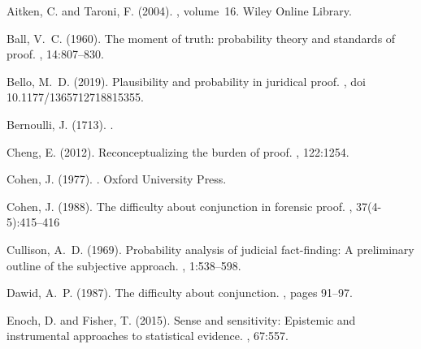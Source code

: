 \documentclass{ifcolog}
\begin{document}


\begin{thebibliography}{}

Aitken, C. and Taroni, F. (2004).
, volume~16.
\newblock Wiley Online Library.

Ball, V.~C. (1960).
\newblock The moment of truth: probability theory and standards of proof.
, 14:807--830.

Bello, M.~D. (2019).
\newblock Plausibility and probability in juridical proof.
, doi 10.1177/1365712718815355.

Bernoulli, J. (1713).
.

Cheng, E. (2012).
\newblock Reconceptualizing the burden of proof.
, 122:1254.

Cohen, J. (1977).
.
\newblock Oxford University Press.


Cohen, J. (1988).
\newblock The difficulty about conjunction in forensic proof.
, 37(4-5):415--416
  
 


Cullison, A.~D. (1969).
\newblock Probability analysis of judicial fact-finding: A preliminary outline
  of the subjective approach.
, 1:538--598.

Dawid, A.~P. (1987).
\newblock The difficulty about conjunction.
, pages 91--97.

Enoch, D. and Fisher, T. (2015).
\newblock Sense and sensitivity: Epistemic and instrumental approaches to
  statistical evidence.
, 67:557.


\end{thebibliography}
\end{document}
